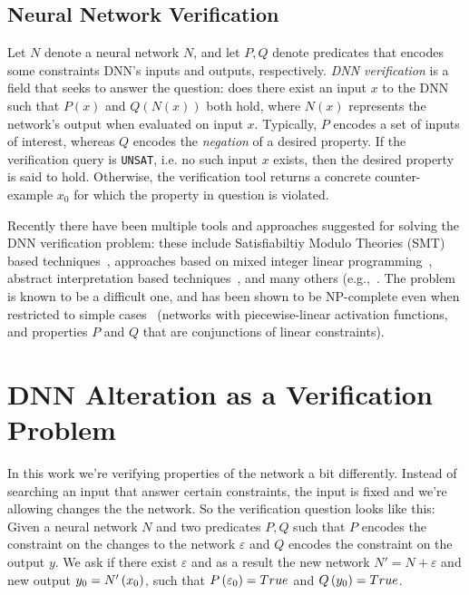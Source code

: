 \documentclass{easychair}
\newcommand{\unsat}{\texttt{UNSAT}}
\newcommand{\guy}[1]{\marginpar{\textcolor{orange}{Guy: #1}}}
\begin{document}
\subsection{Neural Network Verification}


Let $N$ denote a neural network $N$, and let $P,Q$ denote predicates
that encodes some constraints DNN's inputs and outputs, respectively.
\emph{DNN verification} is a field that seeks to answer the question:
does there exist an input $x$ to the DNN such that $P(x)$ and
$Q(N(x))$ both hold, where $N(x)$ represents the network's output when
evaluated on input $x$. Typically, $P$ encodes a set of inputs of
interest, whereas $Q$ encodes the \emph{negation} of a desired
property. If the verification query is \unsat{}, i.e. no such input
$x$ exists, then the desired property is said to hold. Otherwise, the
verification tool returns a concrete counter-example $x_0$ for which
the property in question is violated.


Recently there have been multiple tools and approaches suggested for
solving the DNN verification problem: these include Satisfiabiltiy
Modulo Theories (SMT) based
techniques~\cite{KaBaDiJuKo17Reluplex,KaHuIbJuLaLiShThWuZeDiKoBa19Marabou},
approaches based on mixed integer linear
programming~\cite{Ehlers2017,TjXiTe19}, abstract interpretation based
techniques~\cite{GeMiDrTsChVe18}, and many others
(e.g.,~\cite{HuKwWaWu17,NaKaRySaWa17}. The problem is known to be a
difficult one, and has been shown to be NP-complete even when
restricted to simple cases~\cite{KaBaDiJuKo17Reluplex} (networks with piecewise-linear activation
functions, and properties $P$ and $Q$ that are conjunctions of linear constraints).


\section{DNN Alteration as a Verification Problem}
\label{sec:minimizationProblem}

\guy{TODO: first paragraph moved here from previous section. Integrate
  it better}
In this
work we're verifying properties of the network a bit
differently. Instead of searching an input that answer certain
constraints, the input is fixed and we're allowing changes the the
network. So the verification question looks like this: Given a neural
network $N$ and two predicates $P,Q$ such that $P$ encodes the
constraint on the changes to the network $\varepsilon$ and $Q$ encodes
the constraint on the output $y$. We ask if there exist $\varepsilon$
and as a result the new network $N'=N+\varepsilon$ and new output
$y_0=N'\left(x_0\right)$, such that $P\left(\varepsilon_0\right)=True$
and $Q\left(y_0\right)=True$.
\cite{KaBaDiJuKo17Reluplex,KaHuIbJuLaLiShThWuZeDiKoBa19Marabou}
\end{document}
